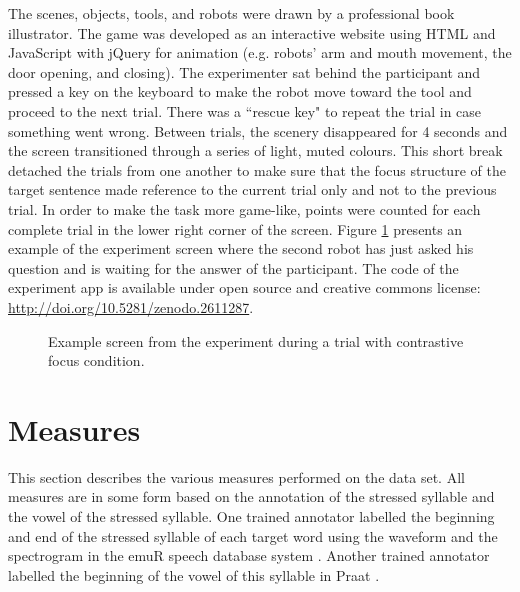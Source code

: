The scenes, objects, tools, and robots were drawn by a professional book illustrator. The game was developed as an interactive website using HTML and JavaScript with jQuery for animation (e.g. robots' arm and mouth movement, the door opening, and closing). The experimenter sat behind the participant and pressed a key on the keyboard to make the robot move toward the tool and proceed to the next trial. There was a ``rescue key" to repeat the trial in case something went wrong. Between trials, the scenery disappeared for 4 seconds and the screen transitioned through a series of light, muted colours. This short break detached the trials from one another to make sure that the focus structure of the target sentence made reference to the current trial only and not to the previous trial. In order to make the task more game-like, points were counted for each complete trial in the lower right corner of the screen. Figure \ref{fig:exp_trial} presents an example of the experiment screen where the second robot has just asked his question and is waiting for the answer of the participant. The code of the experiment app is available under open source and creative commons license: \href{http://doi.org/10.5281/zenodo.2611287}{http://doi.org/10.5281/zenodo.2611287}.

\begin{figure}
\caption{Example screen from the experiment during a trial with contrastive focus condition.}
\label{fig:exp_trial}
\end{figure}

\section{Measures}

This section describes the various measures performed on the data set. All measures are in some form based on the annotation of the stressed syllable and the vowel of the stressed syllable. One trained annotator labelled the beginning and end of the stressed syllable of each target word using the waveform and the spectrogram in the emuR speech database system \citep{Winkelmannetal2018}. Another trained annotator labelled the beginning of the vowel of this syllable in Praat \citep{BoersmaWeenink2018}. 

